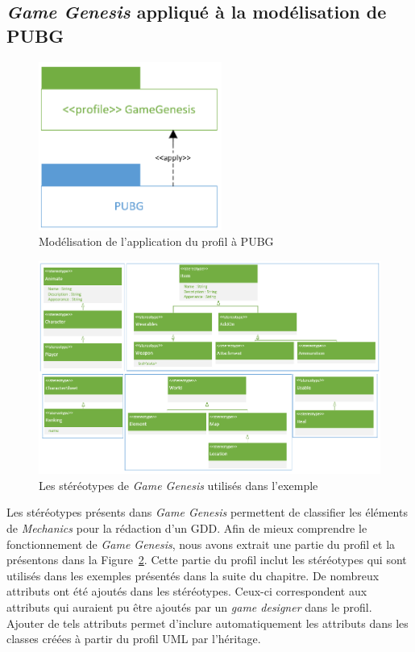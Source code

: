 \subsection{\emph{Game Genesis} appliqué à la modélisation de PUBG}

\begin{figure}
    \centering
    \includegraphics[width=6cm]{10_img/chap6/profile_gg_apply_pubg.PNG}
    \caption{Modélisation de l'application du profil à PUBG}
    \label{fig.racine_stereo}
\end{figure}

\begin{figure}
    \centering
    \includegraphics[width=14cm]{10_img/chap6/final_profile.PNG}
    \caption{Les stéréotypes de \emph{Game Genesis} utilisés dans l'exemple}
    \label{fig.racine_stereo}
\end{figure}


Les stéréotypes présents dans \emph{Game Genesis} permettent de classifier les \'el\'ements de \emph{Mechanics} pour la rédaction d'un GDD.
Afin de mieux comprendre le fonctionnement de \emph{Game Genesis}, nous avons extrait une partie du profil et la pr\'esentons dans la Figure~\ref{fig.racine_stereo}.
Cette partie du profil inclut les stéréotypes qui sont utilisés dans les exemples présentés dans la suite du chapitre.
De nombreux attributs ont été ajoutés dans les stéréotypes.
Ceux-ci correspondent aux attributs qui auraient pu être ajoutés par un \emph{game designer} dans le profil.
Ajouter de tels attributs permet d'inclure automatiquement les attributs dans les classes créées à partir du profil UML par l'héritage.


